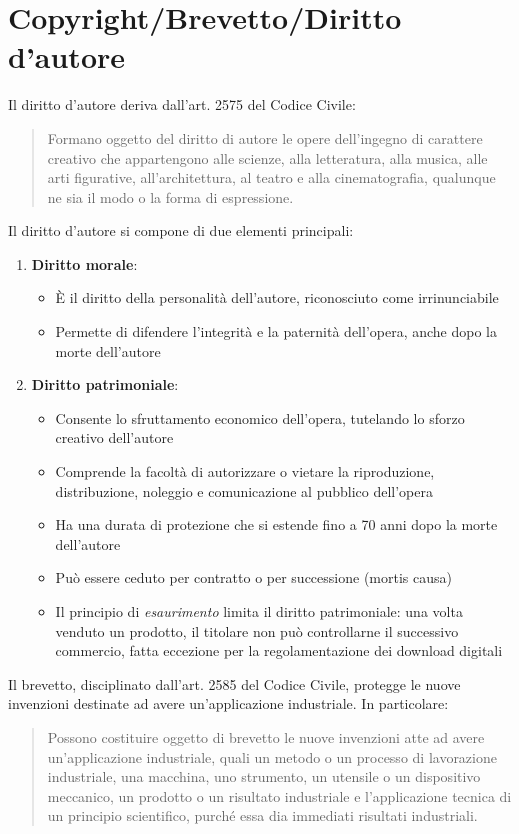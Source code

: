 \documentclass[10pt,oneside,a4paper]{article}
\begin{document}
	\section{Copyright/Brevetto/Diritto d'autore}
	Il diritto d'autore deriva dall'art. 2575 del Codice Civile:
	\begin{quote}
		Formano oggetto del diritto di autore le opere dell'ingegno di carattere creativo che appartengono alle scienze, alla letteratura, alla musica, alle arti figurative, all'architettura, al teatro e alla cinematografia, qualunque ne sia il modo o la forma di espressione.
	\end{quote}
	Il diritto d'autore si compone di due elementi principali:
	\begin{enumerate}
		\item \textbf{Diritto morale}:  
		\begin{itemize}
			\item È il diritto della personalità dell'autore, riconosciuto come irrinunciabile
			\item Permette di difendere l'integrità e la paternità dell'opera, anche dopo la morte dell'autore
		\end{itemize}
		\item \textbf{Diritto patrimoniale}:  
		\begin{itemize}
			\item Consente lo sfruttamento economico dell'opera, tutelando lo sforzo creativo dell'autore
			\item Comprende la facoltà di autorizzare o vietare la riproduzione, distribuzione, noleggio e comunicazione al pubblico dell'opera
			\item Ha una durata di protezione che si estende fino a 70 anni dopo la morte dell'autore
			\item Può essere ceduto per contratto o per successione (mortis causa)
			\item Il principio di \textit{esaurimento} limita il diritto patrimoniale: una volta venduto un prodotto, il titolare non può controllarne il successivo commercio, fatta eccezione per la regolamentazione dei download digitali
		\end{itemize}
	\end{enumerate}
	Il brevetto, disciplinato dall'art. 2585 del Codice Civile, protegge le nuove invenzioni destinate ad avere un'applicazione industriale. In particolare:
	\begin{quote}
		Possono costituire oggetto di brevetto le nuove invenzioni atte ad avere un'applicazione industriale, quali un metodo o un processo di lavorazione industriale, una macchina, uno strumento, un utensile o un dispositivo meccanico, un prodotto o un risultato industriale e l'applicazione tecnica di un principio scientifico, purché essa dia immediati risultati industriali.
	\end{quote}
\end{document}
